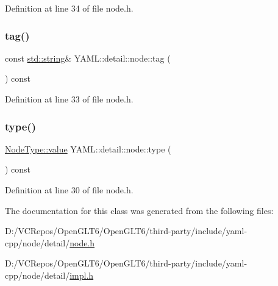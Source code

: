 Definition at line 34 of file node.\+h.

\mbox{\label{class_y_a_m_l_1_1detail_1_1node_af3835475a5b5c9bd8082c78ec61d9030}} 
\subsubsection{\texorpdfstring{tag()}{tag()}}
{\footnotesize\ttfamily const \mbox{\hyperlink{glad_8h_ac83513893df92266f79a515488701770}{std\+::string}}\& Y\+A\+M\+L\+::detail\+::node\+::tag (\begin{DoxyParamCaption}{ }\end{DoxyParamCaption}) const\hspace{0.3cm}{\ttfamily [inline]}}



Definition at line 33 of file node.\+h.

\mbox{\label{class_y_a_m_l_1_1detail_1_1node_a5527fb2ef1005527911cc2b66b553601}} 
\subsubsection{\texorpdfstring{type()}{type()}}
{\footnotesize\ttfamily \mbox{\hyperlink{struct_y_a_m_l_1_1_node_type_af83cf3f3c2eca0bf0eae1bbf981e86c4}{Node\+Type\+::value}} Y\+A\+M\+L\+::detail\+::node\+::type (\begin{DoxyParamCaption}{ }\end{DoxyParamCaption}) const\hspace{0.3cm}{\ttfamily [inline]}}



Definition at line 30 of file node.\+h.



The documentation for this class was generated from the following files\+:\begin{DoxyCompactItemize}
\item 
D\+:/\+V\+C\+Repos/\+Open\+G\+L\+T6/\+Open\+G\+L\+T6/third-\/party/include/yaml-\/cpp/node/detail/\mbox{\hyperlink{detail_2node_8h}{node.\+h}}\item 
D\+:/\+V\+C\+Repos/\+Open\+G\+L\+T6/\+Open\+G\+L\+T6/third-\/party/include/yaml-\/cpp/node/detail/\mbox{\hyperlink{detail_2impl_8h}{impl.\+h}}\end{DoxyCompactItemize}
